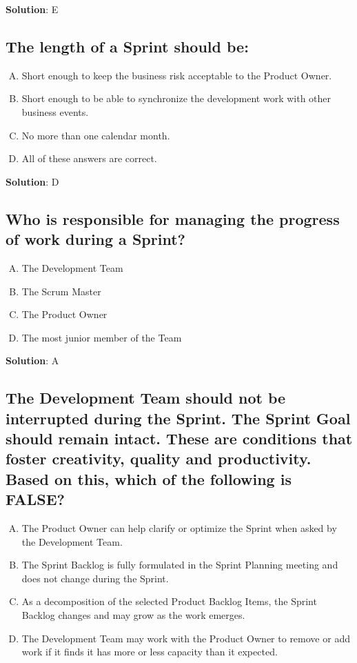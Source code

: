 \textbf{Solution}: E


\subsection{The length of a Sprint should be:}
\begin{enumerate}[A)]
  \item Short enough to keep the business risk acceptable to the Product Owner.
  \item Short enough to be able to synchronize the development work with other business events.
  \item No more than one calendar month.
  \item All of these answers are correct.
\end{enumerate}


\textbf{Solution}: D


\subsection{Who is responsible for managing the progress of work during a Sprint?}
\begin{enumerate}[A)]
  \item The Development Team
  \item The Scrum Master
  \item The Product Owner
  \item The most junior member of the Team
\end{enumerate}


\textbf{Solution}: A


\subsection{The Development Team should not be interrupted during the Sprint. The Sprint Goal should remain intact. These are conditions that foster creativity, quality and productivity. Based on this, which of the following is FALSE?}
\begin{enumerate}[A)]
  \item The Product Owner can help clarify or optimize the Sprint when asked by the Development Team.
  \item The Sprint Backlog is fully formulated in the Sprint Planning meeting and does not change during the Sprint.
  \item As a decomposition of the selected Product Backlog Items, the Sprint Backlog changes and may grow as the work emerges.
  \item The Development Team may work with the Product Owner to remove or add work if it finds it has more or less capacity than it expected.
\end{enumerate}


